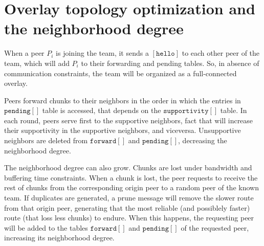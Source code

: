 \section{Overlay topology optimization and the neighborhood degree}

When a peer $P_i$ is joining the team, it sends a $[\mathtt{hello}]$
to each other peer of the team, which will add $P_i$ to their
forwarding and pending tables. So, in absence of communication
constraints, the team will be organized as a full-connected overlay.

Peers forward chunks to their neighbors in the order in which the
entries in $\mathtt{pending}[]$ table is accessed, that depends on the
$\mathtt{supportivity}[]$ table. In each round, peers serve first to
the supportive neighbors, fact that will increase their supportivity
in the supportive neighbors, and viceversa. Unsupportive neighbors are
deleted from $\mathtt{forward}[]$ and $\mathtt{pending}[]$, decreasing
the neighborhood degree.

The neighborhood degree can also grow. Chunks are lost under bandwidth
and buffering time constraints. When a chunk is lost, the peer
requests to receive the rest of chunks from the corresponding origin
peer to a random peer of the known team. If duplicates are generated,
a prune message will remove the slower route from that origin peer,
generating that the most reliable (and possiblely faster) route (that
loss less chunks) to endure. When this happens, the requesting peer
will be added to the tables $\mathtt{forward}[]$ and
$\mathtt{pending}[]$ of the requested peer, increasing its
neighborhood degree.

